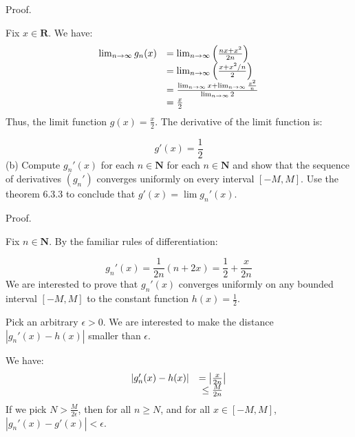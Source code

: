 \documentclass[10pt]{article}
\begin{document}
Proof.



Fix $\displaystyle x\in \mathbf{R}$. We have:
\begin{equation*}
\begin{array}{ c l }
\lim _{n\rightarrow \infty } g_{n}( x) & =\lim _{n\rightarrow \infty }\left(\frac{nx+x^{2}}{2n}\right)\\
 & =\lim _{n\rightarrow \infty }\left(\frac{x+x^{2} /n}{2}\right)\\
 & =\frac{\lim _{n\rightarrow \infty } x+\lim _{n\rightarrow \infty }\frac{x^{2}}{n}}{\lim _{n\rightarrow \infty } 2}\\
 & =\frac{x}{2}
\end{array}
\end{equation*}
Thus, the limit function $\displaystyle g( x) =\frac{x}{2}$. The derivative of the limit function is:


\begin{equation*}
g'( x) =\frac{1}{2}
\end{equation*}
(b) Compute $\displaystyle g_{n} '( x)$ for each $\displaystyle n\in \mathbf{N}$ for each $\displaystyle n\in \mathbf{N}$ and show that the sequence of derivatives $\displaystyle ( g_{n} ')$ converges uniformly on every interval $\displaystyle [ -M,M]$. Use the theorem 6.3.3 to conclude that $\displaystyle g'( x) =\lim g_{n} '( x)$.



Proof.



Fix $\displaystyle n\in \mathbf{N}$. By the familiar rules of differentiation:


\begin{equation*}
g_{n} '( x) =\frac{1}{2n}( n+2x) =\frac{1}{2} +\frac{x}{2n}
\end{equation*}
We are interested to prove that $\displaystyle g_{n} '( x)$ converges uniformly on any bounded interval $\displaystyle [ -M,M]$ to the constant function $\displaystyle h( x) =\frac{1}{2}$. 

Pick an arbitrary $\displaystyle \epsilon  >0$. We are interested to make the distance $\displaystyle |g_{n} '( x) -h( x) |$ smaller than $\displaystyle \epsilon $.



We have:
\begin{equation*}
\begin{array}{ c c }
|g_{n} '( x) -h( x) | & =\left| \frac{x}{2n}\right| \\
 & \leq \frac{M}{2n}
\end{array}
\end{equation*}
If we pick $\displaystyle N >\frac{M}{2\epsilon }$, then for all $\displaystyle n\geq N$, and for all $\displaystyle x\in [ -M,M]$, $\displaystyle |g_{n} '( x) -g'( x) |< \epsilon $.
\end{document}
